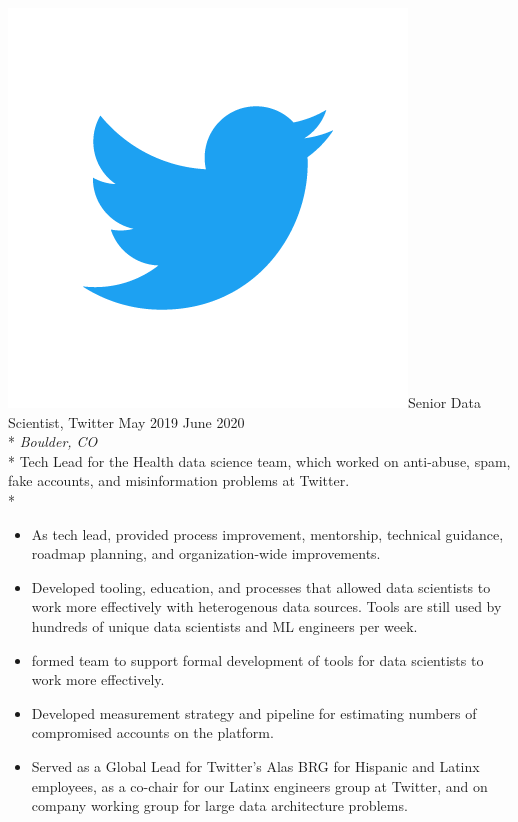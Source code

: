 \documentclass[print]{friggeri-cv} %
\newcommand{\twittericon}{\includegraphics[scale=0.05]{Twitter_Logo_Blue.png}}%
\begin{document}
\begin{description} \itemsep1pt \parskip0pt 
  \item \twittericon {\largeheaderfont Senior Data Scientist, Twitter} \hfill
    {\smallheaderfont May 2019 \textemdash June 2020}\\*
    {\footnotesize \emph{Boulder, CO}} \\*
    Tech Lead for the Health data science team, which worked on
    anti-abuse, spam, fake accounts, and misinformation problems at Twitter. \\*
    \begin{itemize} \itemsep1pt \parskip1pt 
      \item As tech lead, provided process improvement, mentorship, technical guidance, roadmap
      planning, and organization-wide improvements.
      
      \item Developed tooling, education, and processes that allowed data scientists to work more effectively with 
      heterogenous data sources. Tools are still used by hundreds of unique data scientists and ML engineers per week.

      \item formed team to support formal development of tools for data scientists to work more effectively.

      \item Developed measurement strategy and pipeline for estimating numbers of compromised accounts on the platform.
      
      \item Served as a Global Lead for Twitter's Alas BRG for Hispanic and
      Latinx employees, as a co-chair for our Latinx engineers group at Twitter, and on 
      company working group for large data architecture problems.
      
  \end{itemize}

  \end{description}
\end{document}
